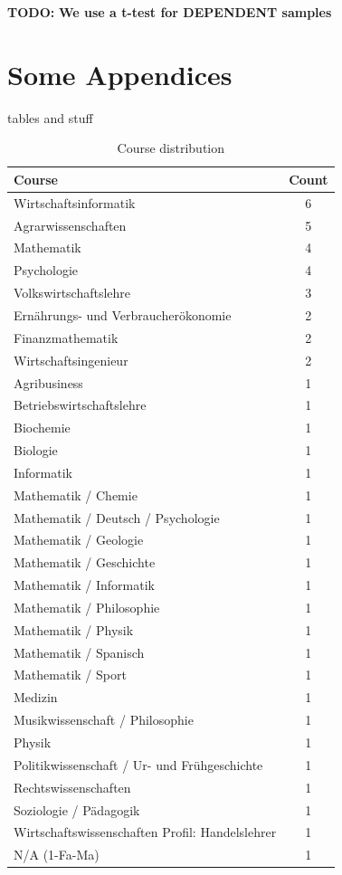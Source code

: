 \documentclass{sig-alternate-05-2015}
\newcommand{\todo}{\textbf{TODO:} \textbf}
\begin{document}
\todo{We use a t-test for DEPENDENT samples}
\section{Some Appendices}
tables and stuff

\begin{table}[!h]
	\centering
	\caption{Course distribution}\label{tab:course}
	\begin{tabular}{@{}p{14cm}|c}
		\toprule
		\textbf{Course} & \textbf{Count} \\
		\midrule Wirtschaftsinformatik & 6 \\
		\midrule Agrarwissenschaften & 5 \\
		\midrule Mathematik & 4 \\
		\midrule Psychologie & 4 \\
		\midrule Volkswirtschaftslehre & 3 \\
		\midrule Ernährungs- und Verbraucherökonomie & 2 \\
		\midrule Finanzmathematik & 2 \\
		\midrule Wirtschaftsingenieur & 2 \\
		\midrule Agribusiness & 1 \\
		\midrule Betriebswirtschaftslehre & 1 \\
		\midrule Biochemie & 1 \\
		\midrule Biologie & 1 \\
		\midrule Informatik & 1 \\
		
		\midrule Mathematik / Chemie & 1 \\
		\midrule Mathematik / Deutsch / Psychologie & 1 \\
		\midrule Mathematik / Geologie & 1 \\
		\midrule Mathematik / Geschichte & 1 \\
		\midrule Mathematik / Informatik & 1 \\
		\midrule Mathematik / Philosophie & 1 \\
		\midrule Mathematik / Physik & 1 \\
		\midrule Mathematik / Spanisch & 1 \\
		\midrule Mathematik / Sport & 1 \\
		
		\midrule Medizin & 1 \\
		\midrule Musikwissenschaft / Philosophie & 1 \\
		\midrule Physik & 1 \\
		\midrule Politikwissenschaft / Ur- und Frühgeschichte & 1 \\
		\midrule Rechtswissenschaften & 1 \\
		\midrule Soziologie / Pädagogik & 1 \\
		\midrule Wirtschaftswissenschaften Profil: Handelslehrer & 1 \\
		\midrule N/A (1-Fa-Ma) & 1 \\
	\end{tabular}
\end{table}
\end{document}
